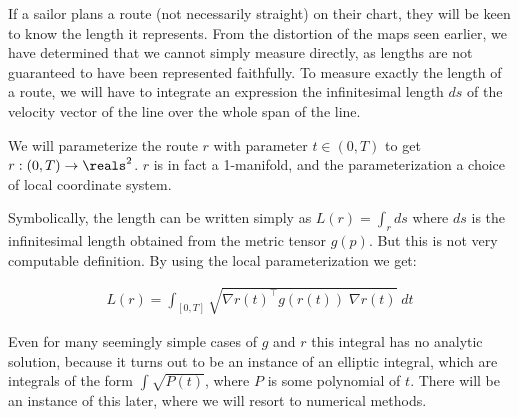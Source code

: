 If a sailor plans a route (not necessarily straight) on their chart, they will be keen to know the length it represents. From the distortion of the maps seen earlier, we have determined that we cannot simply measure directly, as lengths are not guaranteed to have been represented faithfully. To measure exactly the length of a route, we will have to integrate an expression the infinitesimal length $ds$ of the velocity vector of the line over the whole span of the line. 

We will parameterize the route $r$ with parameter $t \in (0, T)$ to get $r: (0, T) \to \reals^2$. $r$ is in fact a 1-manifold, and the parameterization a choice of local coordinate system. 

Symbolically, the length can be written simply as $L(r) = \int_r ds$ where $ds$ is the infinitesimal length obtained from the metric tensor $g(p)$. But this is not very computable definition. By using the local parameterization we get:

\begin{align*} 
L(r) = \int_{[0, T]} \sqrt{\nabla r(t)^\top g(r(t))\; \nabla r(t)} \; dt
\end{align*}

Even for many seemingly simple cases of $g$ and $r$ this integral has no analytic solution, because it turns out to be an instance of an elliptic integral, which are integrals of the form $\int \sqrt{P(t)}$, where $P$ is some polynomial of $t$. There will be an instance of this later, where we will resort to numerical methods.


